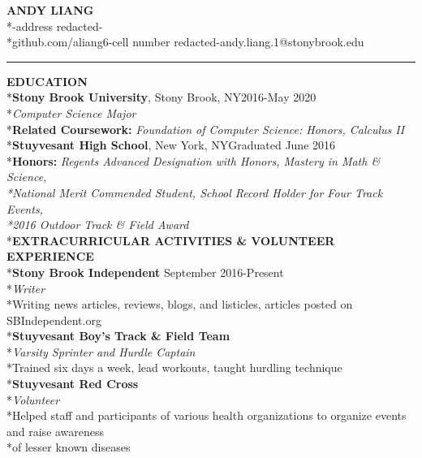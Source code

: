 \documentclass[11pt]{letter}
\begin{document}
\begin{center}
\LARGE\textbf{ANDY LIANG}
\bigskip
\normalsize\\*-address redacted-
\smallskip
\\*github.com/aliang6\hspace{0.25cm}\textbar\hspace{0.25cm}-cell number redacted-\hspace{0.25cm}\textbar\hspace{0.25cm}andy.liang.1@stonybrook.edu
\rule{\textwidth}{1pt}
\end{center}

\begin{flushleft}
\vspace{-4mm}\large\textbf{EDUCATION}
\\*\normalsize\textbf{Stony Brook University}, Stony Brook, NY\hfill2016-May 2020
\\*\textit{Computer Science Major}
\\*\textbf{Related Coursework: }\textit{Foundation of Computer Science: Honors, Calculus II}
\medskip
\\*\textbf{Stuyvesant High School}, New York, NY\hfill Graduated June 2016
\\*\textbf{Honors: }\textit{Regents Advanced Designation with Honors, Mastery in Math \& Science,\\*National Merit Commended Student, School Record Holder for Four Track Events,\\*2016 Outdoor Track \& Field Award}
\vspace{7.5mm}
\\*\textbf{EXTRACURRICULAR ACTIVITIES \& VOLUNTEER EXPERIENCE}
\\*\textbf{Stony Brook Independent} \hfill September 2016-Present
\\*\textit{Writer}
\\*\qquad Writing news articles, reviews, blogs, and listicles, articles posted on SBIndependent.org
\\*\textbf{Stuyvesant Boy's Track \& Field Team}
\\*\textit{Varsity Sprinter and Hurdle Captain}
\\*\qquad Trained six days a week, lead workouts, taught hurdling technique
\\*\textbf{Stuyvesant Red Cross}
\\*\textit{Volunteer}
\\*\qquad Helped staff and participants of various health organizations to organize events and raise awareness \\*\qquad of lesser known diseases

\end{flushleft}
\end{document}
